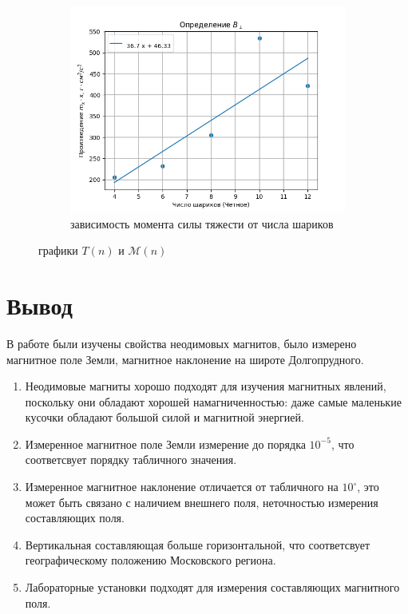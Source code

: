 \documentclass[a4paper, 12pt]{article}
\begin{document}
\begin{enumerate}
\begin{figure}[htbp]
        \hfill
        \begin{subfigure}{0.7\textwidth}
            \centering
            \includegraphics[width=\linewidth]{vertical.png}
            \caption{зависимость момента силы тяжести от числа шариков}
            \label{вертикальная составляющая}
        \end{subfigure}
        \caption{графики $T(n)$ и $\mathcal{M}(n)$}
        \label{графики моментов и периодов}
    \end{figure}
\end{enumerate}
\section*{Вывод}
    В работе были изучены свойства неодимовых магнитов, было измерено магнитное поле Земли, магнитное наклонение на широте Долгопрудного.
    \begin{enumerate}
        \item Неодимовые магниты хорошо подходят для изучения магнитных явлений, поскольку они обладают хорошей намагниченностью: даже самые
        маленькие кусочки обладают большой силой и магнитной энергией.
        \item Измеренное магнитное поле Земли измерение до порядка $10^{-5}$, что соответсвует порядку табличного значения.
        \item Измеренное магнитное наклонение отличается от табличного на $10^{\circ}$, это может быть связано с наличием внешнего поля,
        неточностью измерения составляющих поля.
        \item Вертикальная  составляющая больше горизонтальной, что соответсвует географическому положению Московского региона.
        \item Лабораторные установки подходят для измерения составляющих магнитного поля.
    \end{enumerate}
\end{document}
